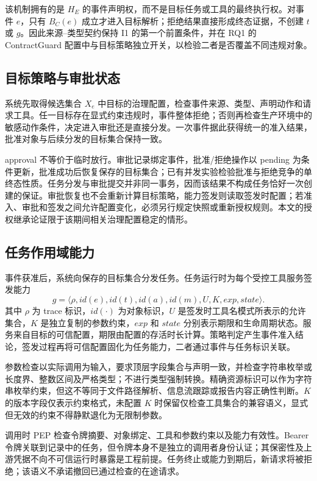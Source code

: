 该机制拥有的是 $H_E$ 的事件声明权，而不是目标任务或工具的最终执行权。对事件 $e$，只有 $B_C(e)$ 成立才进入目标解析；拒绝结果直接形成终态证据，不创建 $t$ 或 $g$。因此来源--类型契约保持 I1 的第一个前置条件，并在 RQ1 的 ContractGuard 配置中与目标策略独立开关，以检验二者是否覆盖不同违规对象。

\subsection{目标策略与审批状态}

系统先取得候选集合 $X_e$ 中目标的治理配置，检查事件来源、类型、声明动作和请求工具。任一目标存在显式约束违规时，事件整体拒绝；否则再检查生产环境中的敏感动作条件，决定进入审批还是直接分发。一次事件据此获得统一的准入结果，批准对象与后续分发的目标集合保持一致。

approval 不等价于临时放行。审批记录绑定事件，批准/拒绝操作以 pending 为条件更新，批准成功后恢复保存的目标集合；已有并发实验检验批准与拒绝竞争的单终态性质。任务分发与审批提交并非同一事务，因而该结果不构成任务恰好一次创建的保证。审批恢复也不会重新计算目标策略，能力签发则读取签发时配置；若准入、审批和签发之间允许配置变化，必须另行规定快照或重新授权规则。本文的授权继承论证限于该期间相关治理配置稳定的情形。

\subsection{任务作用域能力}

事件获准后，系统向保存的目标集合分发任务。任务运行时为每个受控工具服务签发能力
\begin{equation}
g=\langle \rho,id(e),id(t),id(a),id(m),U,K,exp,state\rangle .
\label{eq:grant-v11}
\end{equation}
其中 $\rho$ 为 trace 标识，$id(\cdot)$ 为对象标识，$U$ 是签发时工具名模式所表示的允许集合，$K$ 是独立复制的参数约束，$exp$ 和 $state$ 分别表示期限和生命周期状态。服务来自目标的可信配置，期限由配置的存活时长计算。策略判定产生事件准入结论，签发过程再将可信配置固化为任务能力，二者通过事件与任务标识关联。

参数检查以实际调用为输入，要求顶层字段集合与声明一致，并检查字符串枚举或长度界、整数区间及严格类型；不进行类型强制转换。精确资源标识可以作为字符串枚举约束，但这不等同于文件路径解析、信息流跟踪或报告内容正确性判断。$K$ 的版本字段仅表示约束格式，未配置 $K$ 时保留仅检查工具集合的兼容语义，显式但无效的约束不得静默退化为无限制参数。

调用时 PEP 检查令牌摘要、对象绑定、工具和参数约束以及能力有效性。Bearer 令牌关联到记录中的任务，但令牌本身不是独立的调用者身份认证；其保密性及上游凭据不向不可信运行时暴露是工程前提。任务终止或能力到期后，新请求将被拒绝；该语义不承诺撤回已通过检查的在途请求。


